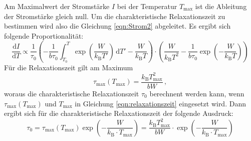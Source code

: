         \noindent Am Maximalwert der Stromstärke $I$ bei der Temperatur $T_\text{max}$ ist die Ableitung der Stromstärke gleich null. Um die charakteristische Relaxationszeit zu bestimmen
        wird also die Gleichung \eqref{eqn:Strom2} abgeleitet. Es ergibt sich folgende Proportionalität:
        \begin{equation}
            \frac{\text{d}I}{\text{d}T} \propto \frac{1}{\tau_0} \left(- \frac{1}{b \tau_0} \int_{T_0}^T \exp\left(\frac{W}{k_\text{B} T'}\right) \, \text{d}T' - \frac{W}{k_\text{B} T}\right) \cdot \left( \frac{W}{k_\text{B}T^2} - \frac{1}{b\tau_0}\exp\left(- \frac{W}{k_\text{B} T}\right)\right)
            \label{eqn:relaxa}
        \end{equation}
        Für die Relaxationszeit gilt am Maximum 
        \begin{equation}
            \tau_{\text{max}} (T_{\text{max}}) = \frac{k_\text{B} T^2_{\text{max}}}{b W}\, ,
        \end{equation}
        woraus die charakteristische Relaxationszeit $\tau_0$ berechnent werden kann, wenn $\tau_{\text{max}} (T_{\text{max}})$ und $T_{\text{max}}$ in Gleichung \eqref{eqn:relaxationszeit} eingesetzt wird.
        Dann ergibt sich für die charakteristische Relaxationszeit der folgende Ausdruck:
        \begin{equation}
            \tau_0 = \tau_{\text{max}} (T_{\text{max}}) \exp \left(- \frac{W}{k_{\text{B}} \cdot T_\text{max}}\right) = \frac{k_\text{B} T^2_{\text{max}}}{b W} \cdot\exp \left(- \frac{W}{k_{\text{B}} \cdot T_\text{max}}\right)
        \end{equation}